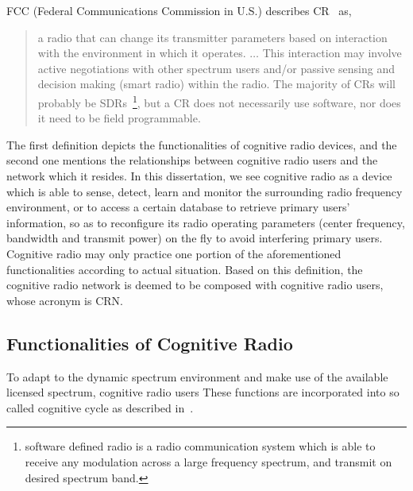 FCC (Federal Communications Commission in U.S.) describes CR~\cite{FCC_03-322} as,
\blockquote{
a radio that can change its transmitter parameters based on interaction with the environment in which it operates. $\ldots$
This interaction may involve active negotiations with other spectrum users and/or passive sensing and decision making (smart radio) within the radio. 
The majority of CRs will probably be SDRs~\footnote{software defined radio is a radio communication system which is able to receive any modulation across a large frequency spectrum, and transmit on desired spectrum band.}, but a CR does not necessarily use software, nor does it need to be field programmable.
}

The first definition depicts the functionalities of cognitive radio devices, and the second one mentions the relationships between cognitive radio users and the network which it resides.
In this dissertation, we see cognitive radio as a device which is able to sense, detect, learn and monitor the surrounding radio frequency environment, or to access a certain database to retrieve primary users' information, so as to reconfigure its radio operating parameters (\eg center frequency, bandwidth and transmit power) on the fly to avoid interfering primary users.
Cognitive radio may only practice one portion of the aforementioned functionalities according to actual situation.
Based on this definition, the cognitive radio network is deemed to be composed with cognitive radio users, whose acronym is \gls{CRN}.


\subsection{Functionalities of Cognitive Radio}
To adapt to the dynamic spectrum environment and make use of the available licensed spectrum, cognitive radio users %
These functions are incorporated into so called cognitive cycle as described in~\cite{Akyildiz09}.

